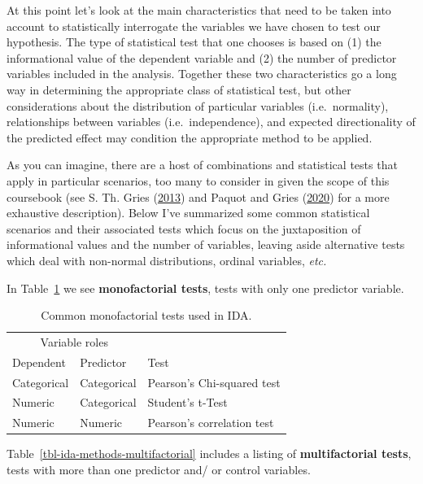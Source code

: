 \documentclass[
  letterpaper,
  DIV=11,
  numbers=noendperiod]{scrreport}
\theoremstyle{definition}
\theoremstyle{remark}
\begin{document}
At this point let's look at the main characteristics that need to be
taken into account to statistically interrogate the variables we have
chosen to test our hypothesis. The type of statistical test that one
chooses is based on (1) the informational value of the dependent
variable and (2) the number of predictor variables included in the
analysis. Together these two characteristics go a long way in
determining the appropriate class of statistical test, but other
considerations about the distribution of particular variables
(i.e.~normality), relationships between variables (i.e.~independence),
and expected directionality of the predicted effect may condition the
appropriate method to be applied.

As you can imagine, there are a host of combinations and statistical
tests that apply in particular scenarios, too many to consider in given
the scope of this coursebook (see S. Th. Gries
(\protect\hyperlink{ref-Gries2013a}{2013}) and Paquot and Gries
(\protect\hyperlink{ref-Paquot2020a}{2020}) for a more exhaustive
description). Below I've summarized some common statistical scenarios
and their associated tests which focus on the juxtaposition of
informational values and the number of variables, leaving aside
alternative tests which deal with non-normal distributions, ordinal
variables, \emph{etc.}

In Table~\ref{tbl-ida-methods-monofactorial} we see
\textbf{monofactorial tests}, tests with only one predictor variable.

\hypertarget{tbl-ida-methods-monofactorial}{}
\begin{table}
\caption{\label{tbl-ida-methods-monofactorial}Common monofactorial tests used in IDA. }\tabularnewline

\centering
\begin{tabular}{l|l|l}
\hline
\multicolumn{2}{c|}{Variable roles} & \multicolumn{1}{c}{ } \\
\cline{1-2}
Dependent & Predictor & Test\\
\hline
Categorical & Categorical & Pearson's Chi-squared test\\
\hline
Numeric & Categorical & Student's t-Test\\
\hline
Numeric & Numeric & Pearson's correlation test\\
\hline
\end{tabular}
\end{table}

Table~\ref{tbl-ida-methods-multifactorial} includes a listing of
\textbf{multifactorial tests}, tests with more than one predictor and/
or control variables.
\end{document}
